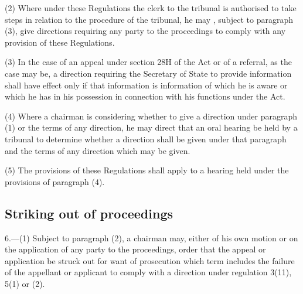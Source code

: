 \documentclass[12pt,a4paper]{article}
\begin{document}
(2) Where under these Regulations the clerk to the tribunal is authorised to take steps in relation to the procedure of the tribunal, he may%
, subject to paragraph (3),  %
give directions requiring any party to the proceedings to comply with any provision of these Regulations.

(3) In the case of an appeal under section 28H of the Act or of a referral, as the case may be, a direction requiring the Secretary of State to provide information shall have effect only if that information is information of which he is aware or which he has in his possession in connection with his functions under the Act.

(4) Where a chairman is considering whether to give a direction under paragraph (1) or the terms of any direction, he may direct that an oral hearing be held by a tribunal to determine whether a direction shall be given under that paragraph and the terms of any direction which may be given.

(5) The provisions of these Regulations shall apply to a hearing held under the provisions of paragraph (4).


\subsection[6. Striking out of proceedings]{Striking out of proceedings}

6.—(1) Subject to paragraph (2), a chairman may, either of his own motion or on the application of any party to the proceedings, order that the appeal or application be struck out 
for want of prosecution which term includes  %
the failure of the appellant or applicant to comply with 
a direction under regulation 3(11), 5(1) or (2).  %
\end{document}
